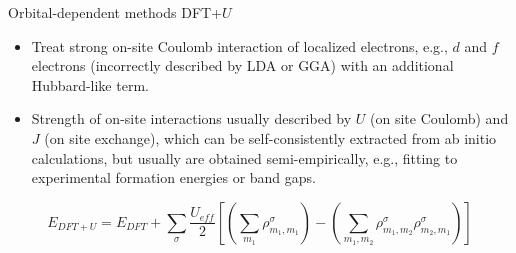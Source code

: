 \documentclass[aspectratio=169]{beamer}
\begin{document}
    \begin{frame}{Orbital-dependent methods}
        DFT+$U$\cite{anisimovBandTheoryMott1991,anisimovDensityFunctionalTheoryNio1993,dudarevElectronenergylossSpectraStructural1998}
        \begin{itemize}
            \item Treat strong on-site Coulomb interaction of localized electrons, e.g., $d$ and $f$ electrons (incorrectly described by LDA or GGA) with an additional Hubbard-like term.
            \item Strength of on-site interactions usually described by $U$ (on site Coulomb) and $J$ (on site exchange), which can be self-consistently extracted from ab initio calculations,\cite{cococcioniLinearResponseApproach2005} but usually are obtained semi-empirically, e.g., fitting to experimental formation energies or band gaps.
        \end{itemize}
        \begin{equation*}
            E_{DFT+U} = E_{DFT} + \sum_\sigma \frac{U_{eff}}{2} \left[ \left( \sum_{m_1} \rho_{m_1,m_1}^\sigma \right) - \left( \sum_{m_1,m_2} \rho_{m_1,m_2}^\sigma\rho_{m_2,m_1}^\sigma \right)  \right]
        \end{equation*}

    \end{frame}
\end{document}
